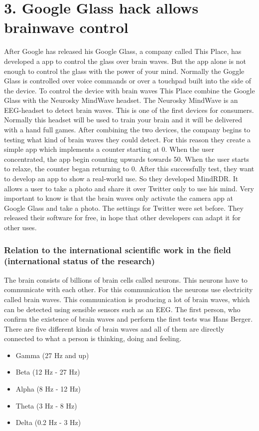\documentclass[a4paper,11pt]{article}
\begin{document}
\chapter{3. Google Glass hack allows brainwave control}
After Google has released his Google Glass, a company called This Place, has developed a app to control the glass over brain waves. But the app alone is not enough to control the glass with the power of your mind. Normally the Goggle Glass is controlled over voice commands or over a touchpad built into the side of the device. To control the device with brain waves This Place combine the Google Glass with the Neurosky MindWave headset. The Neurosky MindWave is an EEG-headset to detect brain waves. This is one of the first devices for consumers. Normally this headset will be used to train your brain and it will be delivered with a hand full games. After combining the two devices, the company begins to testing what kind of brain waves they could detect. For this reason they create a simple app which implements a counter starting at 0. When the user concentrated, the app begin counting upwards towards 50. When the user starts to relaxe, the counter began returning to 0. After this successfully test, they want to develop an app to show a real-world use. So they developed MindRDR. It allows a user to take a photo and share it over Twitter only to use his mind. Very important to know is that the brain waves only activate the camera app at Google Glass and take a photo. The settings for Twitter were set before. They released their software for free, in hope that other developers can adapt it for other uses.

\subsection{Relation to the international scientific work in the field (international status of the research)}
The brain consists of billions of brain cells called neurons. This neurons have to communicate with each other. For this communication the neurons use electricity called brain waves. This communication is producing a lot of brain waves, which can be detected using sensible sensors such as an EEG. The first person, who confirm the existence of brain waves and perform the first tests was Hans Berger. There are five different kinds of brain waves and all of them are directly connected to what a person is thinking, doing and feeling.

\begin{itemize}
 \item Gamma (27 Hz and up)
 \item Beta (12 Hz - 27 Hz)
 \item Alpha (8 Hz - 12 Hz)
 \item Theta (3 Hz - 8 Hz)
 \item Delta (0.2 Hz - 3 Hz)
\end{itemize}
\end{document}
